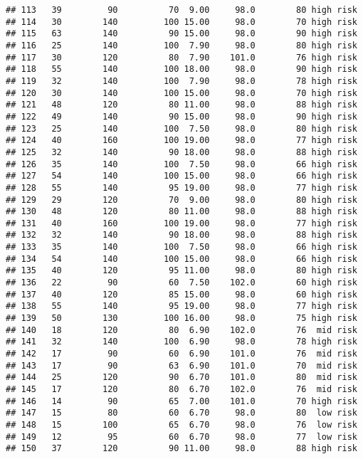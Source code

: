 \documentclass[
  ignorenonframetext,
]{beamer}
\begin{document}
\begin{frame}[fragile]
\begin{verbatim}
## 113   39         90          70  9.00     98.0        80 high risk
## 114   30        140         100 15.00     98.0        70 high risk
## 115   63        140          90 15.00     98.0        90 high risk
## 116   25        140         100  7.90     98.0        80 high risk
## 117   30        120          80  7.90    101.0        76 high risk
## 118   55        140         100 18.00     98.0        90 high risk
## 119   32        140         100  7.90     98.0        78 high risk
## 120   30        140         100 15.00     98.0        70 high risk
## 121   48        120          80 11.00     98.0        88 high risk
## 122   49        140          90 15.00     98.0        90 high risk
## 123   25        140         100  7.50     98.0        80 high risk
## 124   40        160         100 19.00     98.0        77 high risk
## 125   32        140          90 18.00     98.0        88 high risk
## 126   35        140         100  7.50     98.0        66 high risk
## 127   54        140         100 15.00     98.0        66 high risk
## 128   55        140          95 19.00     98.0        77 high risk
## 129   29        120          70  9.00     98.0        80 high risk
## 130   48        120          80 11.00     98.0        88 high risk
## 131   40        160         100 19.00     98.0        77 high risk
## 132   32        140          90 18.00     98.0        88 high risk
## 133   35        140         100  7.50     98.0        66 high risk
## 134   54        140         100 15.00     98.0        66 high risk
## 135   40        120          95 11.00     98.0        80 high risk
## 136   22         90          60  7.50    102.0        60 high risk
## 137   40        120          85 15.00     98.0        60 high risk
## 138   55        140          95 19.00     98.0        77 high risk
## 139   50        130         100 16.00     98.0        75 high risk
## 140   18        120          80  6.90    102.0        76  mid risk
## 141   32        140         100  6.90     98.0        78 high risk
## 142   17         90          60  6.90    101.0        76  mid risk
## 143   17         90          63  6.90    101.0        70  mid risk
## 144   25        120          90  6.70    101.0        80  mid risk
## 145   17        120          80  6.70    102.0        76  mid risk
## 146   14         90          65  7.00    101.0        70 high risk
## 147   15         80          60  6.70     98.0        80  low risk
## 148   15        100          65  6.70     98.0        76  low risk
## 149   12         95          60  6.70     98.0        77  low risk
## 150   37        120          90 11.00     98.0        88 high risk

\end{verbatim}
\end{frame}
\end{document}
